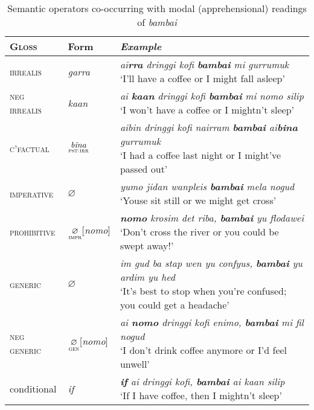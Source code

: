\begin{table}[H]\caption[Semantic operators]{Semantic operators co-occurring with modal (apprehensional) readings of \textit{bambai}}\label{triggers}\centering\small
	\begin{tabular}{lll}\toprule
		\textsc{\textbf{Gloss}} & \textbf{Form} & \textbf{\textit{Example}} \\\midrule\midrule
		\textsc{irrealis} & \textit{garra} &\specialcell[l@]{\textit{ai\textbf{rra} dringgi kofi \textbf{bambai} mi gurrumuk}\\`I'll have a coffee or I might fall asleep'}\\\midrule
		
		\textsc{\gls{neg} irrealis} & \textit{kaan} &\specialcell[l@]{\textit{ai \textbf{kaan} dringgi kofi \textbf{bambai} mi nomo silip}\\`I won't have a coffee or I mightn't sleep'}\\\midrule
		
		\textsc{c'factual} & $\underset{\textsc{pst:irr}}{\textit{bina}}$ &\specialcell[l@]{\textit{aibin dringgi kofi nairram \textbf{bambai} ai\textbf{bina} gurrumuk}\\`I had a coffee last night or I might've passed out'}\\\midrule
		
		\textsc{imperative} & $\varnothing$ & \specialcell[l@]{\textit{yumo jidan wanpleis \textbf{bambai} mela nogud\footnotemark}\\`Youse sit still or we might get cross'}\\\midrule
		\textsc{prohibitive} &  $\underset{\textsc{impr}}{\varnothing}$[\textit{nomo}] & \specialcell[l@]{\textit{\textbf{nomo} krosim det riba, \textbf{bambai} yu flodawei}\\`Don't cross the river or you could be swept away!'}\\\midrule
		
		\textsc{generic} & $\varnothing$ &\specialcell{\textit{im gud ba stap wen yu confyus, \textbf{bambai} yu ardim yu hed}\\`It's best to stop when you're confused; you could get a headache'}\\\midrule
		
		\textsc{\gls{neg} generic} & $\underset{\textsc{gen}}{\varnothing}$[\textit{nomo}] & \specialcell{\textit{ai \textbf{nomo} dringgi kofi enimo, \textbf{bambai} mi fil nogud}\\`I don't drink coffee anymore or I'd feel unwell'}\\\midrule\midrule
		{\sc conditional}&\textit{if}&\specialcell[]{\textit{\textbf{if} ai dringgi kofi, \textbf{bambai} ai kaan silip}\\`If I have coffee, then I mightn't sleep'}\\\bottomrule
		
		
	\end{tabular}
\end{table}



